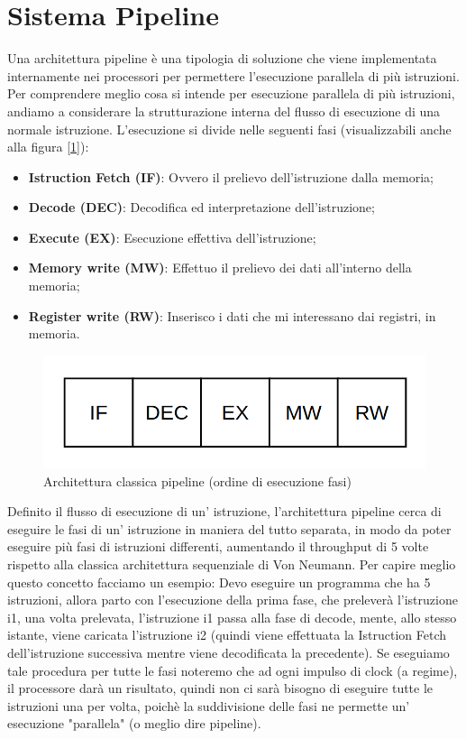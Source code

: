 \newpage
\section{Sistema Pipeline}
Una architettura pipeline è una tipologia di soluzione che viene implementata internamente nei processori per permettere l'esecuzione parallela di più istruzioni.
Per comprendere meglio cosa si intende per esecuzione parallela di più istruzioni, andiamo a considerare la strutturazione interna del flusso di esecuzione di una normale istruzione. L'esecuzione si divide nelle seguenti fasi (visualizzabili anche alla figura [\ref{img:pipe}]):
\begin{itemize}
    \item \textbf{Istruction Fetch (IF)}: Ovvero il prelievo dell'istruzione dalla memoria;
    \item \textbf{Decode (DEC)}: Decodifica ed interpretazione dell'istruzione;
    \item \textbf{Execute (EX)}: Esecuzione effettiva dell'istruzione;
    \item \textbf{Memory write (MW)}: Effettuo il prelievo dei dati all'interno della memoria;
    \item \textbf{Register write (RW)}: Inserisco i dati che mi interessano dai registri, in memoria. 
\end{itemize}

\begin{figure}
    \centering
    \includegraphics[width=.5\textwidth]{img/Pipeline.png}
    \caption{Architettura classica pipeline (ordine di esecuzione fasi)}\label{img:pipe}
\end{figure}

Definito il flusso di esecuzione di un' istruzione, l'architettura pipeline cerca di eseguire le fasi di un' istruzione in maniera del tutto separata, in modo da poter eseguire più fasi di istruzioni differenti, aumentando il throughput di 5 volte rispetto alla classica architettura sequenziale di Von Neumann. Per capire meglio questo concetto facciamo un esempio:
Devo eseguire un programma che ha 5 istruzioni, allora parto con l'esecuzione della prima fase, che preleverà l'istruzione i1, una volta prelevata, l'istruzione i1 passa alla fase di decode, mente, allo stesso istante, viene caricata l'istruzione i2 (quindi viene effettuata la Istruction Fetch dell'istruzione successiva mentre viene decodificata la precedente). Se eseguiamo tale procedura per tutte le fasi noteremo che ad ogni impulso di clock (a regime), il processore darà un risultato, quindi non ci sarà bisogno di eseguire tutte le istruzioni una per volta, poichè la suddivisione delle fasi ne permette un' esecuzione "parallela" (o meglio dire pipeline).

